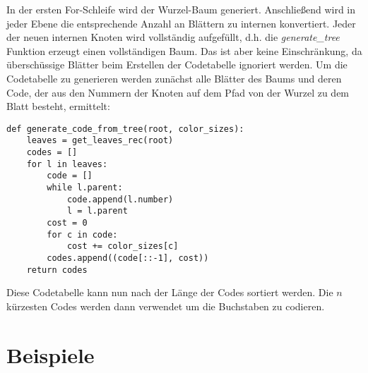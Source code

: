 \documentclass[a4paper,10pt,ngerman]{scrartcl}
\begin{document}
    In der ersten For-Schleife wird der Wurzel-Baum generiert.
    Anschließend wird in jeder Ebene die entsprechende Anzahl an Blättern zu internen konvertiert.
    Jeder der neuen internen Knoten wird vollständig aufgefüllt, d.h. die \textit{generate\_tree} Funktion erzeugt einen vollständigen Baum.
    Das ist aber keine Einschränkung, da überschüssige Blätter beim Erstellen der Codetabelle ignoriert werden.
    Um die Codetabelle zu generieren werden zunächst alle Blätter des Baums und deren Code, der aus den Nummern der Knoten auf dem Pfad von der Wurzel zu dem Blatt besteht, ermittelt:
    \begin{verbatim}
def generate_code_from_tree(root, color_sizes):
    leaves = get_leaves_rec(root)
    codes = []
    for l in leaves:
        code = []
        while l.parent:
            code.append(l.number)
            l = l.parent
        cost = 0
        for c in code:
            cost += color_sizes[c]
        codes.append((code[::-1], cost))
    return codes
    \end{verbatim}
    Diese Codetabelle kann nun nach der Länge der Codes sortiert werden.
    Die $n$ kürzesten Codes werden dann verwendet um die Buchstaben zu codieren.


    \section{Beispiele}
\end{document}
